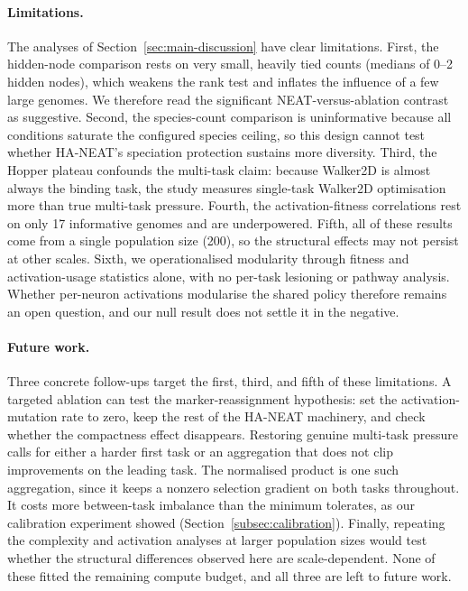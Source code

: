 \documentclass[12pt]{article}
\begin{document}
\paragraph{Limitations.}
The analyses of Section~\ref{sec:main-discussion} have clear limitations.
First, the hidden-node comparison rests on very small, heavily tied counts (medians of 0--2 hidden nodes), which weakens the rank test and inflates the influence of a few large genomes. We therefore read the significant NEAT-versus-ablation contrast as suggestive.
Second, the species-count comparison is uninformative because all conditions saturate the configured species ceiling, so this design cannot test whether HA-NEAT's speciation protection sustains more diversity.
Third, the Hopper plateau confounds the multi-task claim: because Walker2D is almost always the binding task, the study measures single-task Walker2D optimisation more than true multi-task pressure.
Fourth, the activation-fitness correlations rest on only 17 informative genomes and are underpowered.
Fifth, all of these results come from a single population size (200), so the structural effects may not persist at other scales.
Sixth, we operationalised modularity through fitness and activation-usage statistics alone, with no per-task lesioning or pathway analysis. Whether per-neuron activations modularise the shared policy therefore remains an open question, and our null result does not settle it in the negative.

\paragraph{Future work.}
Three concrete follow-ups target the first, third, and fifth of these limitations.
A targeted ablation can test the marker-reassignment hypothesis: set the activation-mutation rate to zero, keep the rest of the HA-NEAT machinery, and check whether the compactness effect disappears.
Restoring genuine multi-task pressure calls for either a harder first task or an aggregation that does not clip improvements on the leading task. The normalised product is one such aggregation, since it keeps a nonzero selection gradient on both tasks throughout. It costs more between-task imbalance than the minimum tolerates, as our calibration experiment showed (Section~\ref{subsec:calibration}).
Finally, repeating the complexity and activation analyses at larger population sizes would test whether the structural differences observed here are scale-dependent.
None of these fitted the remaining compute budget, and all three are left to future work.


\clearpage \printbibliography
\end{document}
